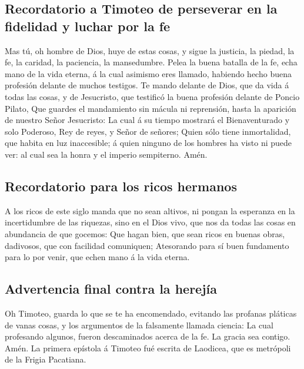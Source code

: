 \hypertarget{recordatorio-a-timoteo-de-perseverar-en-la-fidelidad-y-luchar-por-la-fe}{%
\subsection{Recordatorio a Timoteo de perseverar en la fidelidad y
luchar por la
fe}\label{recordatorio-a-timoteo-de-perseverar-en-la-fidelidad-y-luchar-por-la-fe}}

 Mas tú, oh hombre de Dios, huye de estas cosas, y sigue
la justicia, la piedad, la fe, la caridad, la paciencia, la mansedumbre.
 Pelea la buena batalla de la fe, echa mano de la vida
eterna, á la cual asimismo eres llamado, habiendo hecho buena profesión
delante de muchos testigos.  Te mando delante de Dios,
que da vida á todas las cosas, y de Jesucristo, que testificó la buena
profesión delante de Poncio Pilato,  Que guardes el
mandamiento sin mácula ni reprensión, hasta la aparición de nuestro
Señor Jesucristo:  La cual á su tiempo mostrará el
Bienaventurado y solo Poderoso, Rey de reyes, y Señor de señores;
 Quien sólo tiene inmortalidad, que habita en luz
inaccesible; á quien ninguno de los hombres ha visto ni puede ver: al
cual sea la honra y el imperio sempiterno. Amén.

\hypertarget{recordatorio-para-los-ricos-hermanos}{%
\subsection{Recordatorio para los ricos
hermanos}\label{recordatorio-para-los-ricos-hermanos}}

 A los ricos de este siglo manda que no sean altivos, ni
pongan la esperanza en la incertidumbre de las riquezas, sino en el Dios
vivo, que nos da todas las cosas en abundancia de que gocemos:
 Que hagan bien, que sean ricos en buenas obras,
dadivosos, que con facilidad comuniquen;  Atesorando para
sí buen fundamento para lo por venir, que echen mano á la vida eterna.

\hypertarget{advertencia-final-contra-la-herejuxeda}{%
\subsection{Advertencia final contra la
herejía}\label{advertencia-final-contra-la-herejuxeda}}

 Oh Timoteo, guarda lo que se te ha encomendado, evitando
las profanas pláticas de vanas cosas, y los argumentos de la falsamente
llamada ciencia:  La cual profesando algunos, fueron
descaminados acerca de la fe. La gracia sea contigo. Amén. La primera
epístola á Timoteo fué escrita de Laodicea, que es metrópoli de la
Frigia Pacatiana.
